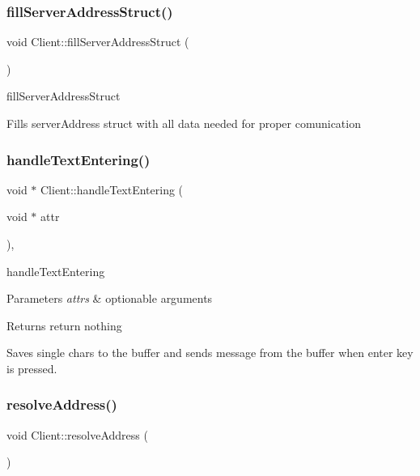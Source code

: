 \subsubsection{\texorpdfstring{fill\+Server\+Address\+Struct()}{fillServerAddressStruct()}}
{\footnotesize\ttfamily void Client\+::fill\+Server\+Address\+Struct (\begin{DoxyParamCaption}{ }\end{DoxyParamCaption})\hspace{0.3cm}{\ttfamily [private]}}



fill\+Server\+Address\+Struct 

Fills server\+Address struct with all data needed for proper comunication \mbox{\label{classClient_ac5bd556f663337b31a577fd0c4d20b7d}} 
\subsubsection{\texorpdfstring{handle\+Text\+Entering()}{handleTextEntering()}}
{\footnotesize\ttfamily void $\ast$ Client\+::handle\+Text\+Entering (\begin{DoxyParamCaption}\item[{void $\ast$}]{attr }\end{DoxyParamCaption})\hspace{0.3cm}{\ttfamily [static]}, {\ttfamily [private]}}



handle\+Text\+Entering 


\begin{DoxyParams}{Parameters}
{\em attrs} & optionable arguments \\
\hline
\end{DoxyParams}
\begin{DoxyReturn}{Returns}
return nothing
\end{DoxyReturn}
Saves single chars to the buffer and sends message from the buffer when \textquotesingle{}enter\textquotesingle{} key is pressed. \mbox{\label{classClient_a68e3bdb6ca10ee50268f219d58b6a3e3}} 
\subsubsection{\texorpdfstring{resolve\+Address()}{resolveAddress()}}
{\footnotesize\ttfamily void Client\+::resolve\+Address (\begin{DoxyParamCaption}{ }\end{DoxyParamCaption})\hspace{0.3cm}{\ttfamily [private]}}




